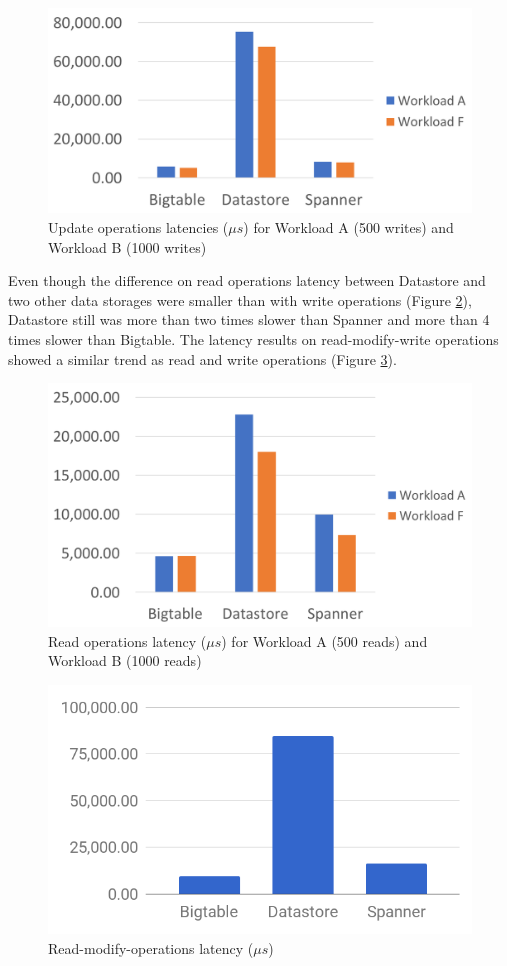 \documentclass[bsc,frontabs,twoside,singlespacing,parskip,deptreport]{infthesis}     %
\begin{document}
\begin{figure}[H]
	\centering
	\includegraphics[width=12cm]{write-latency}
 	\caption{Update operations latencies (\( \mu s\)) for Workload A (500 writes) and Workload B (1000 writes)}
	\label{write-latency}
\end{figure}

Even though the difference on read operations latency between Datastore and two other data storages were smaller than with write operations (Figure \ref{read-latency}), Datastore still was more than two times slower than Spanner and more than 4 times slower than Bigtable. The latency results on read-modify-write operations showed a similar trend as read and write operations (Figure \ref{read-modify-write-latency}). 

\begin{figure}[H]
	\centering
	\includegraphics[width=12cm]{read-latency}
	\caption{Read operations latency (\( \mu s\)) for Workload A (500 reads) and Workload B (1000 reads)}
	\label{read-latency}
\end{figure}

\begin{figure}[H]
	\centering
	\includegraphics[width=12cm]{read-modify-write-latency}
	\caption{Read-modify-operations latency (\( \mu s\))}
	\label{read-modify-write-latency}
\end{figure}
\end{document}
